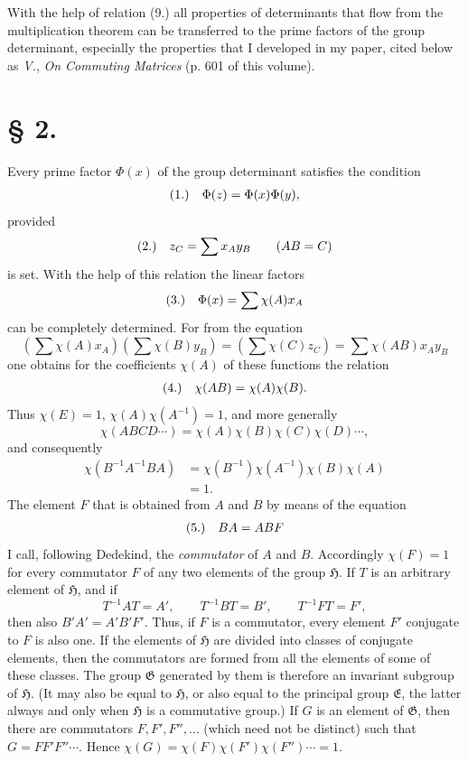 \documentclass[11pt]{article}
\makeatletter
\newcommand{\Hgrp}{\mathfrak{H}}
\newcommand{\Ggrp}{\mathfrak{G}}
\newcommand{\Egrp}{\mathfrak{E}}
\newcommand{\frobtagc}[2]{\[\begin{array}{@{}r@{\quad}c@{}}\textup{(#1)} & \displaystyle #2\end{array}\]}
\makeatother
\begin{document}
With the help of relation (9.) all properties of determinants that flow from the multiplication theorem can be transferred to the prime factors of the group determinant, especially the properties that I developed in my paper, cited below as \emph{V.}, \emph{On Commuting Matrices} (p. 601 of this volume).

\section*{§ 2.}

Every prime factor $\Phi(x)$ of the group determinant satisfies the condition
\frobtagc{1.}{\Phi(z)=\Phi(x)\Phi(y),}
provided
\frobtagc{2.}{z_C=\sum x_Ay_B\qquad (AB=C)}
is set. With the help of this relation the linear factors
\frobtagc{3.}{\Phi(x)=\sum\chi(A)x_A}
can be completely determined. For from the equation
\[
\left(\sum\chi(A)x_A\right)\left(\sum\chi(B)y_B\right)=\left(\sum\chi(C)z_C\right)=\sum\chi(AB)x_Ay_B
\]
one obtains for the coefficients $\chi(A)$ of these functions the relation
\frobtagc{4.}{\chi(AB)=\chi(A)\chi(B).}
Thus $\chi(E)=1$, $\chi(A)\chi(A^{-1})=1$, and more generally
\[
\chi(ABCD\cdots)=\chi(A)\chi(B)\chi(C)\chi(D)\cdots,
\]
and consequently
\[
\begin{aligned}
\chi(B^{-1}A^{-1}BA)
&=\chi(B^{-1})\chi(A^{-1})\chi(B)\chi(A)\\
&=1.
\end{aligned}
\]
The element $F$ that is obtained from $A$ and $B$ by means of the equation
\frobtagc{5.}{BA=ABF}
I call, following Dedekind, the \emph{commutator} of $A$ and $B$. Accordingly $\chi(F)=1$ for every commutator $F$ of any two elements of the group $\Hgrp$. If $T$ is an arbitrary element of $\Hgrp$, and if
\[
T^{-1}AT=A',\qquad T^{-1}BT=B',\qquad T^{-1}FT=F',
\]
then also $B'A'=A'B'F'$. Thus, if $F$ is a commutator, every element $F'$ conjugate to $F$ is also one. If the elements of $\Hgrp$ are divided into classes of conjugate elements, then the commutators are formed from all the elements of some of these classes. The group $\Ggrp$ generated by them is therefore an invariant subgroup of $\Hgrp$. (It may also be equal to $\Hgrp$, or also equal to the principal group $\Egrp$, the latter always and only when $\Hgrp$ is a commutative group.) If $G$ is an element of $\Ggrp$, then there are commutators $F,F',F'',\ldots$ (which need not be distinct) such that $G=FF'F''\cdots$. Hence $\chi(G)=\chi(F)\chi(F')\chi(F'')\cdots=1$.
\end{document}
